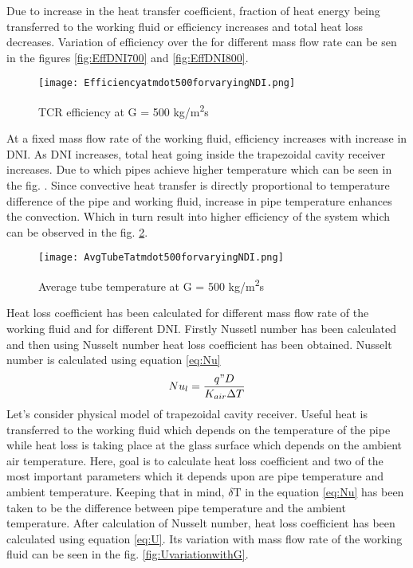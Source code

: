 Due to increase in the heat transfer coefficient, fraction of heat energy being transferred to the working fluid or efficiency increases and total heat loss decreases. Variation of efficiency over the for different mass flow rate can be sen in the figures \ref{fig:EffDNI700} and \ref{fig:EffDNI800}.

\begin{figure}[H]
\begin{center}
\texttt{[image: Efficiencyatmdot500forvaryingNDI.png]}
\caption{TCR efficiency at G = 500 kg/m\textsuperscript{2}s}
\label{fig:EffG500}
\end{center}
\end{figure}
At a fixed mass flow rate of the working fluid, efficiency increases with increase in DNI. As DNI increases, total heat going inside the trapezoidal cavity receiver increases. Due to which pipes achieve higher temperature which can be seen in the fig. . Since convective heat transfer is directly proportional to temperature difference of the pipe and working fluid, increase in pipe temperature enhances the convection. Which in turn result into higher efficiency of the system which can be observed in the fig. \ref{fig:AvgTubeT}.

\begin{figure}[H]
\begin{center}
\texttt{[image: AvgTubeTatmdot500forvaryingNDI.png]}
\caption{Average tube temperature at G = 500 kg/m\textsuperscript{2}s}
\label{fig:AvgTubeT}
\end{center}
\end{figure}

Heat loss coefficient has been calculated for different mass flow rate of the working fluid and for different DNI. Firstly Nussetl number has been calculated and then using Nusselt number heat loss coefficient has been obtained. Nusselt number is calculated using equation \ref{eq:Nu}
\begin{equation}\label{eq:Nu}
Nu_{l} = \frac{q"D}{K_{air}\Delta T}
\end{equation}
Let's consider physical model of trapezoidal cavity receiver. Useful heat is transferred to the working fluid which depends on the temperature of the pipe while heat loss is taking place at the glass surface which depends on the ambient air temperature. Here, goal is to calculate heat loss coefficient and two of the most important parameters which it depends upon are pipe temperature and ambient temperature. Keeping that in mind, $\delta \text{T}$ in the equation \ref{eq:Nu} has been taken to be the difference between pipe temperature and the ambient temperature. After calculation of Nusselt number, heat loss coefficient has been calculated using equation \ref{eq:U}. Its variation with mass flow rate of the working fluid can be seen in the fig. \ref{fig:UvariationwithG}.

